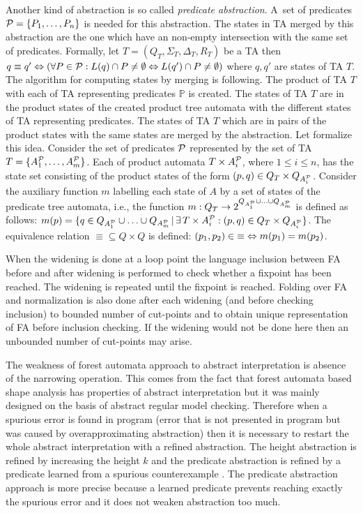 \documentclass[a4paper, 12pt]{article}
\begin{document}
Another kind of abstraction is so called \emph{predicate abstraction}.
A~set of predicates $\predset=\{\pred_1, \ldots, \pred_n\}$ is needed for this abstraction.
The states in TA merged by this abstraction are the one which have an non-empty
intersection with the same set of predicates.
Formally, let $T=(Q_T, \Sigma_T, \Delta_T, R_T)$ be a TA then $q \equiv q' \defarrow
(\forall \pred \in \predset: \langstate{T}{q} \cap \pred \neq \emptyset
\Leftrightarrow \langstate{T}{q'} \cap \pred \neq \emptyset)$
where $q,q'$ are states of TA $T$.
The algorithm for computing states by merging is following.
The product of TA $T$ with each of TA representing predicates $\mathbb{P}$ is created.
The states of TA $T$ are in the product states of the created
product tree automata with the different states of TA representing predicates.
The states of TA $T$ which are in pairs of the product states with
the same states are merged by the abstraction.
Let formalize this idea.
Consider the set of predicates $\predset$ represented by the set of TA
$T=\{\predauti{1}, \ldots, \predauti{m}\}$.
Each of product automata $T \times \predauti{i}$, where $1 \leq i \leq n$, has the state set
consisting of the product states of the form $(p,q) \in Q_T \times Q_{\predauti{i}}$.
Consider the auxiliary function $m$ labelling
each state of $A$ by a set of states of the predicate tree automata,
i.e., the function $m: Q_T \rightarrow 2^{Q_{\predauti{1}} \cup \ldots
\cup Q_{\predauti{m}}}$ is defined as follows: $m(p) = \{q \in Q_{\predauti{1}} \cup \ldots \cup Q_{\predauti{m}}\,|\,
\exists\,T\times\predauti{i}: (p,q) \in Q_{T} \times Q_{\predauti{i}}\}$.
The equivalence relation ${\equiv} \subseteq {Q \times Q}$ is defined:
${(p_1,p_2)} \in {\equiv} \defarrow m(p_1) = m(p_2)$.

When the widening is done at a loop point the language inclusion between
FA before and after widening is performed to check whether a fixpoint has been reached.
The widening is repeated until the fixpoint is reached.
Folding over FA and normalization is also done after each widening (and
before checking inclusion) to bounded number of cut-points
and to obtain unique representation of FA before inclusion checking.
If the widening would not be done here then an unbounded number of cut-points
may arise.

The weakness of forest automata approach to abstract interpretation is absence of
the narrowing operation.
This comes from the fact that forest automata based shape analysis has properties
of abstract interpretation but it was mainly designed on the basis of abstract
regular model checking.
Therefore when a spurious error is found in program (error that is not presented in
program but was caused by overapproximating abstraction) then it is necessary
to restart the whole abstract interpretation with a refined abstraction.
The height abstraction is refined by increasing the height $k$ and the predicate
abstraction is refined by a predicate learned from a spurious counterexample \cite{mt:hruska}.
The predicate abstraction approach is more precise because
a learned predicate prevents reaching exactly the spurious error and
it does not weaken abstraction too much.
\end{document}
